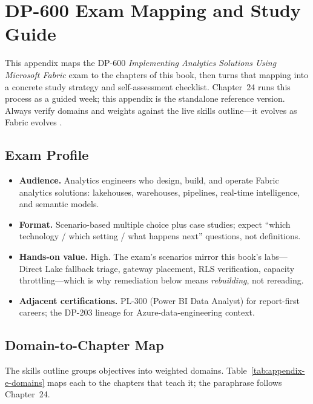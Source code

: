 \chapter{DP-600 Exam Mapping and Study Guide}
%
This appendix maps the DP-600 \emph{Implementing Analytics Solutions Using Microsoft Fabric}
exam to the chapters of this book, then turns that mapping into a concrete study strategy and
self-assessment checklist. Chapter~24 runs this process as a guided week; this appendix is the
standalone reference version. Always verify domains and weights against the live skills
outline---it evolves as Fabric evolves \cite{microsoftDp600}.

\section{Exam Profile}
%
\begin{itemize}
    \item \textbf{Audience.} Analytics engineers who design, build, and operate Fabric
    analytics solutions: lakehouses, warehouses, pipelines, real-time intelligence, and
    semantic models.
    \item \textbf{Format.} Scenario-based multiple choice plus case studies; expect
    ``which technology / which setting / what happens next'' questions, not definitions.
    \item \textbf{Hands-on value.} High. The exam's scenarios mirror this book's labs---Direct
    Lake fallback triage, gateway placement, RLS verification, capacity throttling---which is
    why remediation below means \emph{rebuilding}, not rereading.
    \item \textbf{Adjacent certifications.} PL-300 (Power BI Data Analyst) for report-first
    careers; the DP-203 lineage for Azure-data-engineering context.
\end{itemize}

\section{Domain-to-Chapter Map}
%
The skills outline groups objectives into weighted domains. Table~\ref{tab:appendix-e-domains}
maps each to the chapters that teach it; the paraphrase follows Chapter~24.

